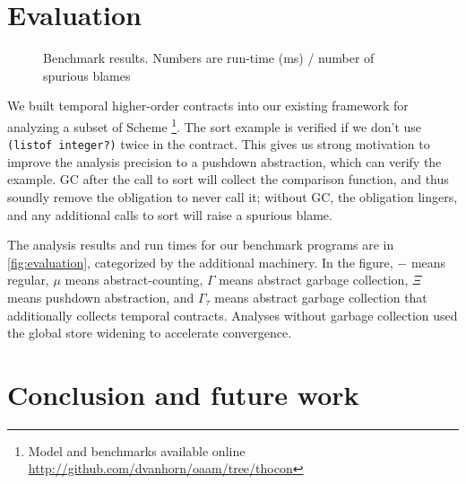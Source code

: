 \section{Evaluation}

\begin{figure}
  
  \caption{Benchmark results. Numbers are run-time (ms) / number of spurious blames}
  \label{fig:evaluation}
\end{figure}
We built temporal higher-order contracts into our existing framework for analyzing a subset of Scheme \footnote{Model and benchmarks available online \url{http://github.com/dvanhorn/oaam/tree/thocon}}.
%
The sort example is verified if we don't use \texttt{(listof integer?)} twice in the contract.
%
This gives us strong motivation to improve the analysis precision to a pushdown abstraction, which can verify the example.
%
GC after the call to sort will collect the comparison function, and thus soundly remove the obligation to never call it; without GC, the obligation lingers, and any additional calls to sort will raise a spurious blame.


The analysis results and run times for our benchmark programs are in \autoref{fig:evaluation}, categorized by the additional machinery.
%
In the figure, $-$ means regular, $\mu$ means abstract-counting, $\Gamma$ means abstract garbage collection, $\Xi$ means pushdown abstraction, and $\Gamma_\tau$ means abstract garbage collection that additionally collects temporal contracts.
%
Analyses without garbage collection used the global store widening to accelerate convergence.
\section{Conclusion and future work} \label{sec:conclusion}

